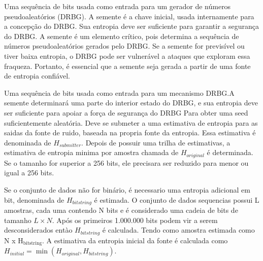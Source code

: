         Uma sequência de bits usada como entrada para um gerador de números pseudoaleatórios (DRBG). A semente é a chave inicial, usada internamente para a concepção do DRBG. Sua entropia deve ser suficiente para garantir a segurança do DRBG.
        A semente é um elemento crítico, pois determina a sequência de números pseudoaleatórios gerados pelo DRBG.\@
        Se a semente for previsível ou tiver baixa entropia, o DRBG pode ser vulnerável a ataques que exploram essa fraqueza. Portanto, é essencial que a semente seja gerada a partir de uma fonte de entropia confiável.


        Uma sequência de bits usada como entrada para um mecanismo DRBG.\@ A semente determinará uma parte do interior estado do DRBG, e sua entropia deve ser suficiente para apoiar a força de segurança do DRBG
        Para obter uma seed suficientemente aleatória. Deve se submeter a uma estimativa de entropia para as saidas da fonte de ruido, baseada na propria fonte da entropia. Essa estimativa é denominada de $\mathit{H_{\text{submitter}}}$.
        Depois de possuir uma trilha de estimativas, a estimativa de entropia minima por amostra chamada de $\mathit{H_{\text{original}}}$ é determinada. 
        Se o tamanho for superior a 256 bits, ele precisara ser reduzido para menor ou igual a 256 bits.

        Se o conjunto de dados não for binário, é necessario uma entropia adicional em bit, denominada de $\mathit{H_{\text{bitstring}}}$ é estimada. O conjunto de dados sequencias possui L amostras, cada uma contendo N bits e é considerado uma cadeia de bits
        de tamanho $L \times N$. Após os primeiros 1.000.000 bits podem vir a serem desconsiderados entào $\mathit{H_{\text{bitstring}}}$ é calculada. Tendo como amostra estimada como N x H$_{\text{bitstring}}$.
        A estimativa da entropia inicial da fonte é calculada como $\mathit{H_{\text{initial}}} = \min(\mathit{H_{\text{original}}}, \mathit{H_{\text{bitstring}}})$.

